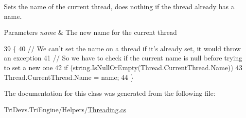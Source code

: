 Sets the name of the current thread, does nothing if the thread already has a name. 


\begin{DoxyParams}{Parameters}
{\em name} & The new name for the current thread\\
\hline
\end{DoxyParams}

\begin{DoxyCode}
39         \{
40             \textcolor{comment}{// We can't set the name on a thread if it's already set, it would throw an exception}
41             \textcolor{comment}{// So we have to check if the current name is null before trying to set a new one}
42             \textcolor{keywordflow}{if} (\textcolor{keywordtype}{string}.IsNullOrEmpty(Thread.CurrentThread.Name))
43                 Thread.CurrentThread.Name = name;
44         \}
\end{DoxyCode}


The documentation for this class was generated from the following file\-:\begin{DoxyCompactItemize}
\item 
Tri\-Devs.\-Tri\-Engine/\-Helpers/\hyperlink{_threading_8cs}{Threading.\-cs}\end{DoxyCompactItemize}
